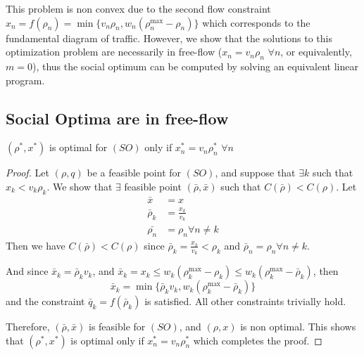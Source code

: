 This problem is non convex due to the second flow constraint $x_n = f(\rho_n) = \min \{ v_n \rho_n, w_n(\rho_n^{\max} - \rho_n ) \}$
which corresponds to the fundamental diagram of traffic. However, we show that the solutions to this optimization problem are necessarily in free-flow ($x_n = v_n \rho_n$ $\forall n$, or equivalently, $m = 0$), thus the social optimum can be computed by solving an equivalent linear program.


\subsection{Social Optima are in free-flow}
\begin{lemma}
\label{lemma:relaxedTTT_is_ff}
$(\rho^*, x^*)$ is optimal for $(SO)$ only if $x^*_n = v_n \rho^*_n$ $\forall n$
\end{lemma}


\begin{proof}
Let $( \rho,  q)$ be a feasible point for $(SO)$, and suppose that $\exists k$ such that $x_k < v_k \rho_k$. We show that $\exists$ feasible point $(\bar{ \rho}, \bar{ x})$ such that $C(\bar{ \rho}) < C( \rho)$.
Let
\begin{align*}
\bar{x} &= x\\
\bar{\rho}_k &= \frac{x_k}{v_k}\\
\bar{\rho_n} &= \rho_n \forall n \neq k
\end{align*}
Then we have $C(\bar{ \rho}) < C( \rho)$ since $\bar{\rho}_k = \frac{x_k}{v_k} < \rho_k$ and $\bar{\rho}_n = \rho_n \forall n \neq k$.

And since $\bar{x}_k = \bar{\rho}_k v_k$, and $\bar{x}_k = x_k \leq w_k(\rho_k^{\max} - \rho_k ) \leq w_k(\rho_k^{\max} - \bar{\rho}_k )$, then
\[
\bar{x}_k = \min \{ \bar{\rho}_k v_k,  w_k(\rho_k^{\max} - \bar{\rho}_k ) \}
\]
and the constraint $\bar{q}_k = f(\bar{\rho}_k)$ is satisfied. All other constraints trivially hold.

Therefore, $(\bar{ \rho}, \bar{ x})$ is feasible for $(SO)$, and $( \rho,  x)$ is non optimal. This shows that $( \rho^*,  x^*)$ is optimal only if $x^*_n = v_n \rho^*_n$ which completes the proof.
\end{proof}

\bigskip

